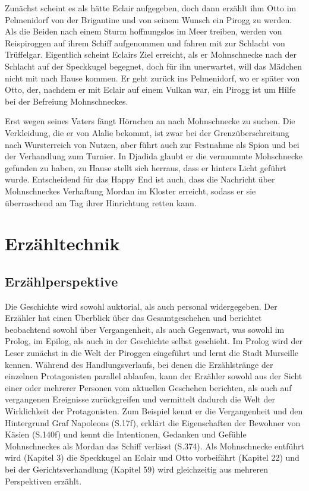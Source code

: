 Zunächst scheint es als hätte Eclair aufgegeben, doch dann erzählt ihm Otto im Pelmenidorf von der Brigantine und von seinem Wunsch ein Pirogg zu werden. Als die Beiden nach einem Sturm hoffnungslos im Meer treiben, werden von Reispiroggen auf ihrem Schiff aufgenommen und fahren mit zur Schlacht von Trüffelgar. Eigentlich scheint Eclairs Ziel erreicht, als er Mohnschnecke nach der Schlacht auf der Speckkugel begegnet, doch für ihn unerwartet, will das Mädchen nicht mit nach Hause kommen. Er geht zurück ins Pelmenidorf, wo er später von Otto, der, nachdem er mit Eclair auf einem Vulkan war, ein Pirogg ist um Hilfe bei der Befreiung Mohnschneckes.

Erst wegen seines Vaters fängt Hörnchen an nach Mohnschnecke zu suchen. Die Verkleidung, die er von Alalie bekommt, ist zwar bei der Grenzüberschreitung nach Wursterreich von Nutzen, aber führt auch zur Festnahme als Spion und bei der Verhandlung zum Turnier. In Djadida glaubt er die vermummte Mohschnecke gefunden zu haben, zu Hause stellt sich herraus, dass er hinters Licht geführt wurde. 
Entscheidend für das Happy End ist auch, dass die Nachricht über Mohnschneckes Verhaftung Mordan im Kloster erreicht, sodass er sie überraschend am Tag ihrer Hinrichtung retten kann.


\section{Erzähltechnik}
	
\subsection{Erzählperspektive}

Die Geschichte wird sowohl auktorial, als auch personal widergegeben. Der Erzähler hat einen Überblick über das Gesamtgeschehen und berichtet  beobachtend sowohl über Vergangenheit, als auch Gegenwart, was sowohl im Prolog, im Epilog, als auch in der Geschichte selbst geschieht. 
Im Prolog wird der Leser zunächst in die Welt der Piroggen eingeführt und lernt die Stadt Murseille kennen. Während des Handlungsverlaufs, bei denen die Erzählstränge der einzelnen Protagonisten parallel ablaufen, kann der Erzähler sowohl aus der Sicht einer oder mehrerer Personen vom aktuellen Geschehen berichten, als auch auf vergangenen Ereignisse zurückgreifen und vermittelt dadurch die Welt der Wirklichkeit der Protagonisten. Zum Beispiel kennt er die Vergangenheit und den Hintergrund Graf Napoleons (S.17f), erklärt die Eigenschaften der Bewohner von Käsien (S.140f) und kennt die Intentionen, Gedanken und Gefühle Mohnschneckes als Mordan das Schiff verlässt (S.374). Als Mohnschnecke entführt wird (Kapitel 3) die Speckkugel an Eclair und Otto vorbeifährt (Kapitel 22) und bei der Gerichtsverhandlung (Kapitel 59) wird gleichzeitig aus mehreren Perspektiven erzählt.

